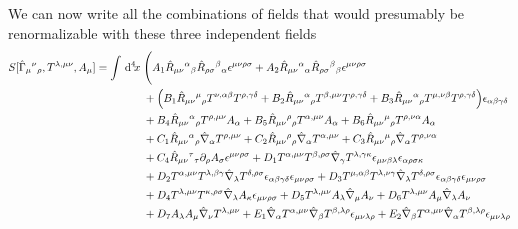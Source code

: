 \documentclass[%
  showpacs,showkeys,prd,superscriptaddress]{revtex4-1}
\begin{document}
We can now write all the combinations of fields that would presumably be renormalizable with these three independent fields
\begin{equation}
  \begin{split}
    \label{3+1full}
     S[\hat\Gamma_{\mu}{}^{\nu}{}_\rho,T^{\lambda,\mu\nu},A_\mu] =\int\dn{4}{x} & \Bigg( A_1 \hat R_{\mu\nu}{}^{\alpha}{}_\beta \hat R_{\rho\sigma}{}^{\beta}{}_\alpha\epsilon^{\mu\nu\rho\sigma}+A_2 \hat R_{\mu\nu}{}^{\alpha}{}_\alpha \hat R_{\rho\sigma}{}^{\beta}{}_\beta\epsilon^{\mu\nu\rho\sigma}
    \\
    & +\Big(B_1 \hat R_{\mu\nu}{}^{\mu}{}_\rho T^{\nu,\alpha\beta}T^{\rho,\gamma\delta}+B_2 \hat R_{\mu\nu}{}^{\alpha}{}_\rho T^{\beta,\mu\nu}T^{\rho,\gamma\delta}+B_3\hat R_{\mu\nu}{}^{\alpha}{}_\rho T^{\mu,\nu\beta}T^{\rho,\gamma\delta}\Big)\epsilon_{\alpha\beta\gamma\delta}
    \\
    & +B_4\hat R_{\mu\nu}{}^{\alpha}{}_\rho T^{\rho,\mu\nu}A_\alpha+B_5\hat R_{\mu\nu}{}^{\rho}{}_\rho T^{\alpha,\mu\nu}A_\alpha+B_6 \hat R_{\mu\nu}{}^{\mu}{}_\rho T^{\rho,\nu\alpha}A_\alpha 
    \\
    & +C_1\hat R_{\mu\nu}{}^{\alpha}{}_\rho \hat\nabla_\alpha T^{\rho,\mu\nu}+C_2\hat R_{\mu\nu}{}^{\rho}{}_\rho \hat\nabla_\alpha T^{\alpha,\mu\nu} +C_3 \hat R_{\mu\nu}{}^{\mu}{}_\rho \hat\nabla_\alpha T^{\rho,\nu\alpha}
    \\
    & +C_4\hat R_{\mu\nu}{}^{\tau}{}_\tau \partial_\rho A_\sigma \epsilon^{\mu\nu\rho\sigma}+D_1T^{\alpha,\mu\nu}T^{\beta,\rho\sigma}\hat\nabla_\gamma T^{\lambda,\gamma\kappa}\epsilon_{\mu\nu\beta\lambda}\epsilon_{\alpha\rho\sigma\kappa}
    \\  
    & + D_2T^{\alpha,\mu\nu}T^{\lambda,\beta\gamma}\hat\nabla_\lambda T^{\delta,\rho\sigma}\epsilon_{\alpha\beta\gamma\delta}\epsilon_{\mu\nu\rho\sigma}+D_3T^{\mu,\alpha\beta}T^{\lambda,\nu\gamma}\hat\nabla_\lambda T^{\delta,\rho\sigma}\epsilon_{\alpha\beta\gamma\delta}\epsilon_{\mu\nu\rho\sigma}
    \\
    & + D_4T^{\lambda,\mu\nu}T^{\kappa,\rho\sigma}\hat\nabla_\lambda A_\kappa \epsilon_{\mu\nu\rho\sigma}+D_5T^{\lambda,\mu\nu}A_\lambda\hat\nabla_\mu A_\nu +D_6T^{\lambda,\mu\nu}A_\mu\hat\nabla_\lambda A_\nu
    \\
    & +D_7A_\lambda  A_\mu\hat\nabla_\nu T^{\lambda,\mu\nu} +E_1\hat\nabla_\alpha T^{\alpha,\mu\nu}\hat\nabla_\beta T^{\beta,\lambda\rho}\epsilon_{\mu\nu\lambda\rho}+E_2\hat\nabla_\beta T^{\alpha,\mu\nu}\hat\nabla_\alpha T^{\beta,\lambda\rho}\epsilon_{\mu\nu\lambda\rho}
    \\

\end{split}
\end{equation}
\end{document}
